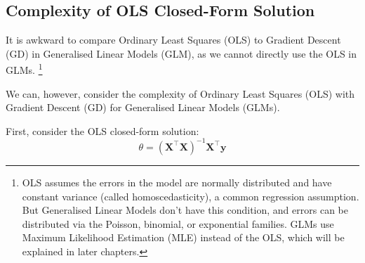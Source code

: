\newpage
\subsection{Complexity of OLS Closed-Form Solution}
It is awkward to compare Ordinary Least Squares (OLS) to Gradient Descent (GD) in Generalised Linear Models (GLM), as we cannot directly use the OLS in GLMs. \footnote{OLS assumes the errors in the model are normally distributed and have constant variance (called homoscedasticity), a common regression assumption. But Generalised Linear Models don't have this condition, and errors can be distributed via the Poisson, binomial, or exponential families. GLMs use Maximum Likelihood Estimation (MLE) instead of the OLS, which will be explained in later chapters. } \bigskip

We can, however, consider the complexity of Ordinary Least Squares (OLS) with Gradient Descent (GD) for Generalised Linear Models (GLMs). \bigskip


First, consider the OLS closed-form solution:
\[
    \theta = (\bm{X}^\top \bm{X})^{-1} \bm{X}^\top \bm{y}
\]

